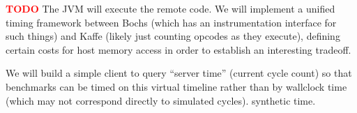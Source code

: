 \documentclass[10pt]{article}
\newcommand{\PROBLEM}[1] {\textbf{\textcolor{red}{#1}}}
\begin{document}
  \PROBLEM{TODO}
  The JVM will execute the remote code. We will implement a
  unified timing framework between Bochs (which has an instrumentation
  interface for such things) and Kaffe (likely just counting opcodes
  as they execute), defining certain costs for host memory access in
  order to establish an interesting tradeoff. 
  
  We will build a simple
  client to query ``server time'' (current cycle count) so that
  benchmarks can be timed on this virtual timeline rather than by
  wallclock time (which may not correspond directly to simulated
  cycles). synthetic time.






\end{document}
